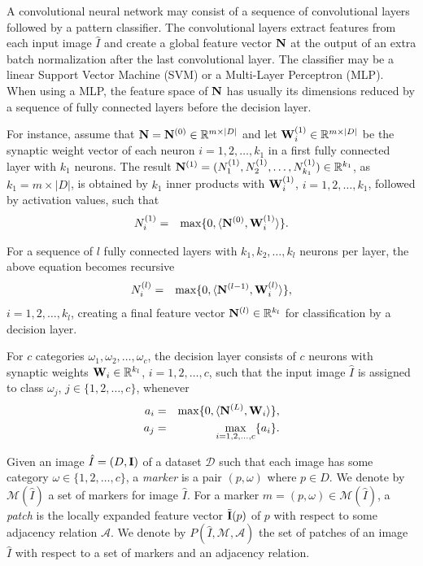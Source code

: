 \documentclass[10pt,twocolumn,letterpaper]{article}
\newcommand{\R}{\mathbb{R}}
\newcommand{\A}{\mathcal{A}}
\newcommand{\D}{\mathcal{D}}
\newcommand{\I}{\hat{I}}
\newcommand{\m}[1]{{\mathrm{\bf #1}}}
\newcommand{\E}{\tilde{\m{I}}}
\newcommand{\lI}{\m{I}}
\newcommand{\gN}{\m{N}}
\newcommand{\W}{\m{W}}
\newcommand{\M}{\mathcal{M}}
\begin{document}
A convolutional neural network may consist of a sequence of
convolutional layers followed by a pattern classifier. The
convolutional layers extract features from each input image $\I$
and create a global feature vector $\gN$ at the output of an
extra batch normalization after the last convolutional layer. The
classifier may be a linear Support Vector Machine (SVM) or a
Multi-Layer Perceptron (MLP). When using a MLP, the feature space of $\gN$ has usually
its dimensions reduced by a sequence of fully connected layers before
the decision layer.

For instance, assume that ${\gN}={\gN}^{(0)}\in \R^{m\times |D|}$
and let ${\W}^{(1)}_i \in \R^{m\times |D|}$ be the synaptic weight
vector of each neuron $i=1,2,\ldots,k_1$ in a first fully connected
layer with $k_1$ neurons. The result ${\gN}^{(1)}=(N^{(1)}_1,N^{(1)}_2,\ldots,N^{(1)}_{k_1})\in \R^{k_1}$, as
$k_1 = m\times |D|$, is obtained by $k_1$ inner products with ${\W}^{(1)}_i$, $i=1,2,\ldots,k_1$, followed by activation values, such that
\begin{eqnarray}
  N^{(1)}_i & = & \max\{0,\langle {\gN}^{(0)}, {\W}^{(1)}_i\rangle\}.
\end{eqnarray}

For a sequence of $l$ fully connected layers with $k_1,  k_2, \ldots, k_l$ neurons per layer, the above equation becomes recursive 
\begin{eqnarray}
  N^{(l)}_i & = & \max\{0,\langle {\gN}^{(l-1)}, {\W}^{(l)}_i\rangle\}, 
\end{eqnarray}
$i=1,2,\ldots,k_l$, creating a final feature vector ${\gN}^{(l)}\in
\R^{k_l}$ for classification by a decision layer.

For $c$ categories $\omega_1, \omega_2, \ldots, \omega_c$, the
decision layer consists of $c$ neurons with synaptic weights ${\W}_i\in \R^{k_l}$, $i=1,2,\ldots,c$, such that the input image
$\I$ is assigned to class $\omega_j$, $j\in \{1,2,\ldots,c\}$,
whenever
\begin{eqnarray}
  a_i & = & \max\{0,\langle {\gN}^{(L)}, {\W}_i\rangle\},\\ 
  a_j & = & \max_{i=1,2,\ldots,c}\{ a_i \}.
\end{eqnarray}

Given an image $\I = (D, \lI)$ of a dataset $\D$ such that each image has some category $\omega \in \{1, 2, \ldots, c\}$, a \textit{marker} is a pair $(p, \omega)$ where $p \in D$. We denote by $\M(\I)$ a set of markers for image $\I$. For a marker $m = (p, \omega) \in \M(\I)$, a \textit{patch} is the locally expanded feature vector $\E(p)$ of $p$ with respect to some adjacency relation $\A$. We denote by $P(\I, \M, \A)$ the set of patches of an image $\I$ with respect to a set of markers and an adjacency relation.
\end{document}
